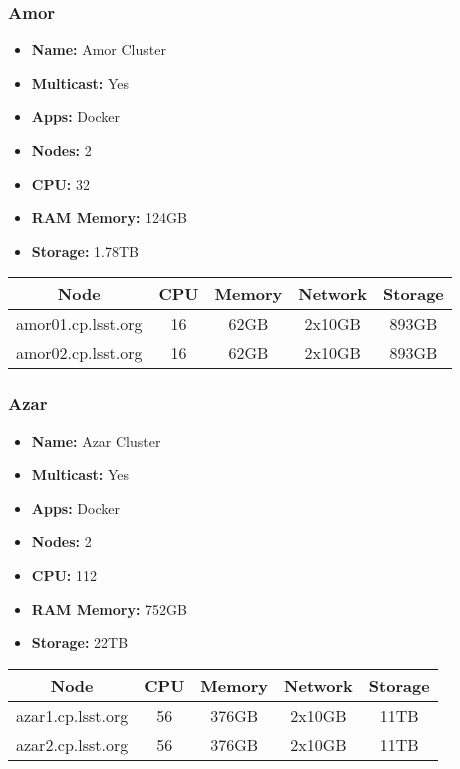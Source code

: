 \subsubsection{Amor}
\begin{itemize}
  \itemsep0em 
  \item \textbf{Name:}       Amor Cluster
  \item \textbf{Multicast:}  Yes
  \item \textbf{Apps:}       Docker
  \item \textbf{Nodes:}      2
  \item \textbf{CPU:}        32
  \item \textbf{RAM Memory:} 124GB
  \item \textbf{Storage:}   1.78TB
\end{itemize}
\begin{center}
  \small
  \begin{tabular}{||c c c c c||}
    \hline
    \textbf{Node} & \textbf{CPU} & \textbf{Memory} & \textbf{Network} & \textbf{Storage} \\ [0.5ex]
    \hline
    amor01.cp.lsst.org & 16 & 62GB & 2x10GB & 893GB \\
    \hline
    amor02.cp.lsst.org & 16 & 62GB & 2x10GB & 893GB \\
    \hline
  \end{tabular}
\end{center}

\subsubsection{Azar}
\begin{itemize}
  \itemsep0em 
  \item \textbf{Name:}       Azar Cluster
  \item \textbf{Multicast:}  Yes
  \item \textbf{Apps:}       Docker
  \item \textbf{Nodes:}      2
  \item \textbf{CPU:}        112
  \item \textbf{RAM Memory:} 752GB
  \item \textbf{Storage:}   22TB
\end{itemize}
\begin{center}
  \small
  \begin{tabular}{||c c c c c||}
    \hline
    \textbf{Node} & \textbf{CPU} & \textbf{Memory} & \textbf{Network} & \textbf{Storage} \\ [0.5ex]
    \hline
    azar1.cp.lsst.org & 56 & 376GB & 2x10GB & 11TB \\
    \hline
    azar2.cp.lsst.org & 56 & 376GB & 2x10GB & 11TB \\
    \hline
  \end{tabular}
\end{center}

